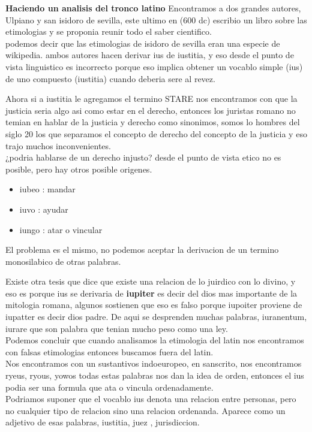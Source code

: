 \documentclass[12pt]{book}
\begin{document}
\textbf{Haciendo un analisis del tronco latino}
Encontramos a dos grandes autores, Ulpiano y san isidoro de sevilla, este ultimo en (600 dc) escribio un libro sobre las etimologias y se proponia reunir todo el saber cientifico.
\\
podemos decir que las etimologias de isidoro de sevilla eran una especie de wikipedia.
ambos autores hacen derivar ius de iustitia, y eso desde el punto de vista linguistico es incorrecto porque eso implica obtener un vocablo simple (ius) de uno compuesto (iustitia) cuando deberia sere al revez.

Ahora si a iustitia le agregamos el termino STARE nos encontramos con que la justicia seria algo asi como estar en el derecho, entonces los juristas romano no temian en hablar de la justicia y derecho como sinonimos, somos lo hombres del siglo 20 los que separamos el concepto de derecho del concepto de la justicia y eso trajo muchos inconvenientes.
\\
¿podria hablarse de un derecho injusto? 
desde el punto de vista etico no es posible, pero hay otros posible origenes.
\begin{itemize}
\item iubeo : mandar
\item iuvo : ayudar
\item iungo : atar o vincular
\end{itemize}

El problema es el mismo, no podemos aceptar la derivacion de un termino monosilabico de otras palabras.

Existe otra tesis que dice que existe una relacion de lo juirdico con lo divino, y eso es porque ius se derivaria de \textbf{iupiter} es decir del dios mas importante de la mitologia romana, algunos sostienen que eso es falso porque iupoiter proviene de iupatter es decir dios padre.
De aqui se desprenden muchas palabras, iuranentum, iurare que son palabra que tenian mucho peso como una ley.
\\
Podemos concluir que cuando analisamos la etimologia del latin nos encontramos con falsas etimologias entonces buscamos fuera del latin.
\\
Nos encontramos con un sustantivos indoeuropeo, en sanscrito, nos encontramos ryeus, ryous, yowos todas estas palabras nos dan la idea de orden, entonces el ius podia ser una formula que ata o vincula ordenadamente.
\\
Podriamos suponer que el vocablo ius denota una relacion entre personas, pero no cualquier tipo de relacion sino una relacion ordenanda. 
Aparece como un adjetivo de esas palabras, iustitia, juez , jurisdiccion.
\end{document}
